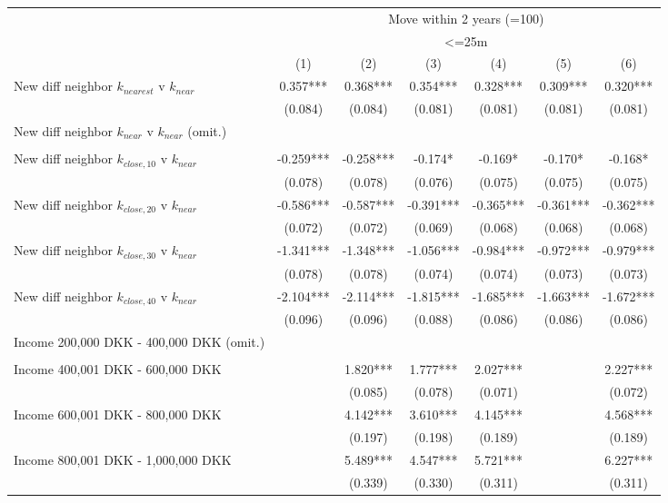 \begin{tabular}{lcccccc}
\toprule
 & \multicolumn{6}{c}{Move within 2 years (=100)} \\ 
\cmidrule(lr){2-7}
 & \multicolumn{6}{c}{<=25m} \\ 
\cmidrule(lr){2-7}
  & (1) & (2) & (3) & (4) & (5) & (6) \\ 
\midrule
New diff neighbor $k_{nearest}$ v $k_{near}$ & 0.357*** & 0.368*** & 0.354*** & 0.328*** & 0.309*** & 0.320*** \\ 
 & (0.084) & (0.084) & (0.081) & (0.081) & (0.081) & (0.081) \\ 
New diff neighbor $k_{near}$ v $k_{near}$ (omit.) & & & & & & \\ 
 &   &   &   &   &   &   \\ 
New diff neighbor $k_{close,10}$ v $k_{near}$ & -0.259*** & -0.258*** & -0.174* & -0.169* & -0.170* & -0.168* \\ 
 & (0.078) & (0.078) & (0.076) & (0.075) & (0.075) & (0.075) \\ 
New diff neighbor $k_{close,20}$ v $k_{near}$ & -0.586*** & -0.587*** & -0.391*** & -0.365*** & -0.361*** & -0.362*** \\ 
 & (0.072) & (0.072) & (0.069) & (0.068) & (0.068) & (0.068) \\ 
New diff neighbor $k_{close,30}$ v $k_{near}$ & -1.341*** & -1.348*** & -1.056*** & -0.984*** & -0.972*** & -0.979*** \\ 
 & (0.078) & (0.078) & (0.074) & (0.074) & (0.073) & (0.073) \\ 
New diff neighbor $k_{close,40}$ v $k_{near}$ & -2.104*** & -2.114*** & -1.815*** & -1.685*** & -1.663*** & -1.672*** \\ 
 & (0.096) & (0.096) & (0.088) & (0.086) & (0.086) & (0.086) \\ 
 Income 200,000 DKK - 400,000 DKK (omit.) &  &  &  &  &  &  \\ 
 &  &  &  &  &  &  \\ 
 Income 400,001 DKK - 600,000 DKK &  & 1.820*** & 1.777*** & 2.027*** &  & 2.227*** \\ 
 &  & (0.085) & (0.078) & (0.071) &  & (0.072) \\ 
Income 600,001 DKK - 800,000 DKK &  & 4.142*** & 3.610*** & 4.145*** &  & 4.568*** \\ 
 &  & (0.197) & (0.198) & (0.189) &  & (0.189) \\ 
Income 800,001 DKK - 1,000,000 DKK &  & 5.489*** & 4.547*** & 5.721*** &  & 6.227*** \\ 
 &  & (0.339) & (0.330) & (0.311) &  & (0.311) \\ 

\end{tabular}
